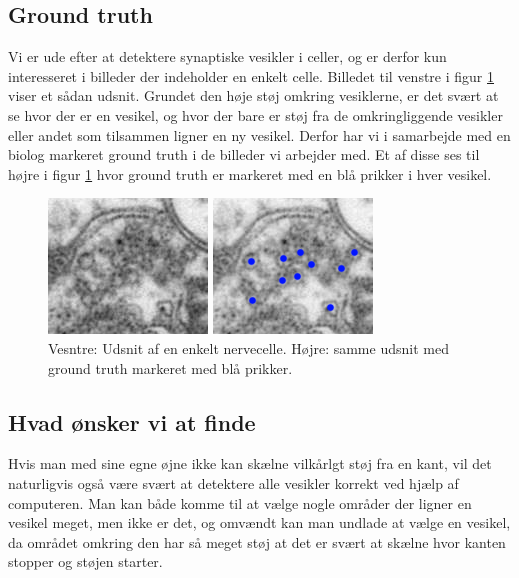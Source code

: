 \subsection{Ground truth}				
Vi er ude efter at detektere synaptiske vesikler i celler, og er derfor kun interesseret i billeder der indeholder en enkelt celle. Billedet til venstre i figur \ref{fig:intro_celle_groundtruth} viser et sådan udsnit. Grundet den høje støj omkring vesiklerne, er det svært at se hvor der er en vesikel, og hvor der bare er støj fra de omkringliggende vesikler eller andet som tilsammen ligner en ny vesikel. Derfor har vi i samarbejde med en biolog markeret ground truth i de billeder vi arbejder med. Et af disse ses til højre i figur \ref{fig:intro_celle_groundtruth} hvor ground truth er markeret med en blå prikker i hver vesikel.

\begin{figure}[H]
	\begin{minipage}[b]{0.5\linewidth}
		\centering
		\includegraphics[scale=1.5]{files/intro/img/celle.png}
	\end{minipage}
	\hspace{0.5cm}
	\begin{minipage}[b]{0.5\linewidth}
		\centering
		\includegraphics[scale=1.5]{files/intro/img/celle_groundtruth.png}
	\end{minipage}
	\caption{Vesntre: Udsnit af en enkelt nervecelle. Højre: samme udsnit med ground truth markeret med blå prikker.\label{fig:intro_celle_groundtruth}}
\end{figure}
  

\subsection{Hvad ønsker vi at finde}
Hvis man med sine egne øjne ikke kan skælne vilkårlgt støj fra en kant, vil det naturligvis også være svært at detektere alle vesikler korrekt ved hjælp af computeren. Man kan både komme til at vælge nogle områder der ligner en vesikel meget, men ikke er det, og omvændt kan man undlade at vælge en vesikel, da området omkring den har så meget støj at det er svært at skælne hvor kanten stopper og støjen starter. 

